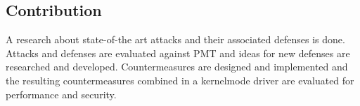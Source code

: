 \subsection{Contribution}
A research about state-of-the art attacks and their associated defenses is done. Attacks and defenses are evaluated against \gls{PMT} and ideas for new defenses are researched and developed. Countermeasures are designed and implemented and the resulting countermeasures combined in a kernelmode driver are evaluated for performance and security.